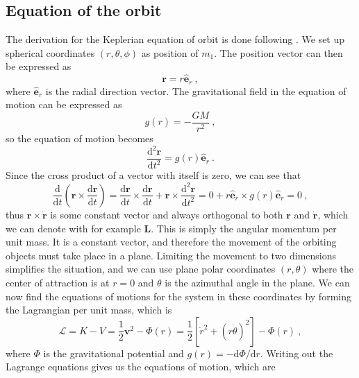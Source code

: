 \documentclass[english, oneside]{HYgradu}
\begin{document}
\subsection{Equation of the orbit}

The derivation for the Keplerian equation of orbit is done following \cite{bt-galdyn}. We set up spherical coordinates $(r, \theta, \phi)$ as position of $m_1$. The position vector can then be expressed as
\begin{equation}
\mathbf{r} = r \hat{\mathbf{e}}_r \ ,
\end{equation}
where $\hat{\mathbf{e}}_r$ is the radial direction vector. The gravitational field in the equation of motion can be expressed as
\begin{equation}
g(r) = -\frac{G M}{r^2} \ ,
\end{equation}
so the equation of motion becomes
\begin{equation}
\frac{\mathrm{d}^2 \mathbf{r}}{\mathrm{d} t^2} = g(r) \hat{\mathbf{e}}_r \ .
\end{equation}
Since the cross product of a vector with itself is zero, we can see that
\begin{equation}
\frac{\mathrm{d}}{\mathrm{d} t} \left( \mathbf{r} \times \frac{\mathrm{d} \mathbf{r}}{\mathrm{d} t} \right) = \frac{\mathrm{d} \mathbf{r}}{\mathrm{d} t} \times \frac{\mathrm{d} \mathbf{r}}{\mathrm{d} t} + \mathbf{r} \times \frac{\mathrm{d}^2 \mathbf{r}}{\mathrm{d} t^2} = 0 + r \hat{\mathbf{e}}_r \times g(r) \hat{\mathbf{e}}_r = 0 \ ,
\end{equation}
thus $\mathbf{r} \times \mathbf{\dot{r}}$ is some constant vector and always orthogonal to both $\mathbf{r}$ and $\dot{\mathbf{r}}$, which we can denote with for example $\mathbf{L}$. This is simply the angular momentum per unit mass. It is a constant vector, and therefore the movement of the orbiting objects must take place in a plane. Limiting the movement to two dimensions simplifies the situation, and we can use plane polar coordinates $(r, \theta)$ where the center of attraction is at $r = 0$ and $\theta$ is the azimuthal angle in the plane. We can now find the equations of motions for the system in these coordinates by forming the Lagrangian per unit mass, which is
\begin{equation}
\mathcal{L} = K - V = \frac{1}{2} \mathbf{v}^2 - \Phi (r) = \frac{1}{2} \left[ \dot{r}^2 + (r \dot{\theta})^2 \right] - \Phi (r) \ ,
\end{equation}
where $\Phi$ is the gravitational potential and $g(r) = -\mathrm{d} \Phi / \mathrm{d} r$. Writing out the Lagrange equations gives us the equations of motion, which are
\end{document}

